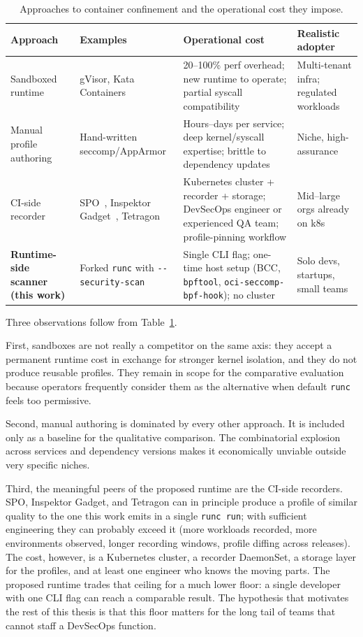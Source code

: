 \begin{table}[ht]
\centering
\caption{Approaches to container confinement and the operational cost they impose.}
\label{tab:competitors}
\begin{tabular}{p{3.0cm}p{3.5cm}p{4.5cm}p{2.8cm}}
\toprule
\textbf{Approach} & \textbf{Examples} & \textbf{Operational cost} & \textbf{Realistic adopter} \\
\midrule
Sandboxed runtime & gVisor, Kata Containers & 20--100\% perf overhead; new runtime to operate; partial syscall compatibility~\cite{wang2022,viktorsson2020} & Multi-tenant infra; regulated workloads \\
Manual profile authoring & Hand-written seccomp/AppArmor & Hours--days per service; deep kernel/syscall expertise; brittle to dependency updates & Niche, high-assurance \\
CI-side recorder & SPO~\cite{spo2025}, Inspektor Gadget~\cite{inspektorgadget2025}, Tetragon~\cite{tetragon2025} & Kubernetes cluster + recorder + storage; DevSecOps engineer or experienced QA team; profile-pinning workflow & Mid--large orgs already on k8s \\
\textbf{Runtime-side scanner (this work)} & Forked \texttt{runc} with \texttt{-{}-security-scan} & Single CLI flag; one-time host setup (BCC, \texttt{bpftool}, \texttt{oci-seccomp-bpf-hook}); no cluster & Solo devs, startups, small teams \\
\bottomrule
\end{tabular}
\end{table}

Three observations follow from Table~\ref{tab:competitors}.

First, sandboxes are not really a competitor on the same axis: they accept a permanent runtime cost in exchange for stronger kernel isolation, and they do not produce reusable profiles. They remain in scope for the comparative evaluation because operators frequently consider them as the alternative when default \texttt{runc} feels too permissive.

Second, manual authoring is dominated by every other approach. It is included only as a baseline for the qualitative comparison. The combinatorial explosion across services and dependency versions makes it economically unviable outside very specific niches.

Third, the meaningful peers of the proposed runtime are the CI-side recorders. SPO, Inspektor Gadget, and Tetragon can in principle produce a profile of similar quality to the one this work emits in a single \texttt{runc run}; with sufficient engineering they can probably exceed it (more workloads recorded, more environments observed, longer recording windows, profile diffing across releases). The cost, however, is a Kubernetes cluster, a recorder DaemonSet, a storage layer for the profiles, and at least one engineer who knows the moving parts. The proposed runtime trades that ceiling for a much lower floor: a single developer with one CLI flag can reach a comparable result. The hypothesis that motivates the rest of this thesis is that this floor matters for the long tail of teams that cannot staff a DevSecOps function.

